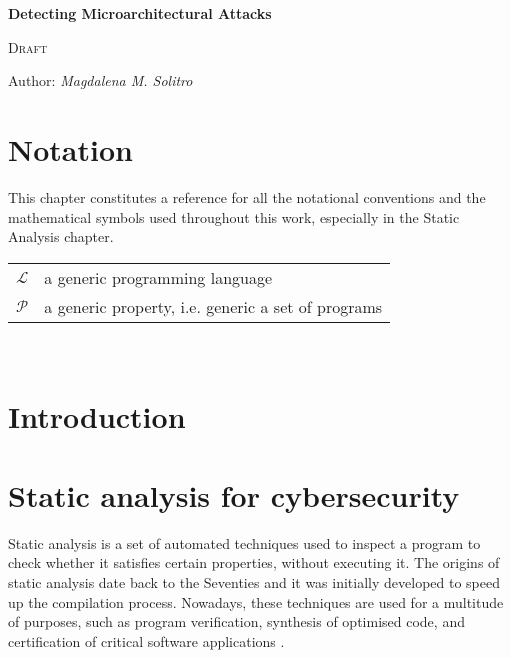 \documentclass[12pt,a4paper]{book}
\theoremstyle{definition}
\begin{document}
	
	\begin{titlepage}
		\begin{center}
			\vspace*{1cm}
			
			\Huge
			\textbf{\Huge Detecting Microarchitectural Attacks}
			
			\vspace{0.3cm}
			\LARGE \textsc{Draft}
			
			\vspace{1.5cm}
			
			\large Author: \textit{Magdalena M. Solitro}
			
			\vfill
		\end{center}
	\end{titlepage}
	
	\tableofcontents
	
	\mainmatter
	
	\chapter*{Notation}
	This chapter constitutes a reference for all the notational conventions and the mathematical symbols used throughout this work, especially in the Static Analysis chapter. 
	\renewcommand{\arraystretch}{2.0}
	\setlength{\tabcolsep}{25pt}
	\begin{tabular}{l l}
		$\mathcal{L}$ & a generic programming language \\
		$\mathcal{P}$ & a generic property, i.e. generic a set of programs
	\end{tabular}\\
	
	\chapter{Introduction}\label{chapter:intro}
	
	\chapter{Static analysis for cybersecurity}\label{chapter:static_analysis}
	Static analysis is a set of automated techniques used to inspect a program to check whether it satisfies certain properties, without executing it. The origins of static analysis date back to the Seventies and it was initially developed to speed up the compilation process. Nowadays, these techniques are used for a multitude of purposes, such as program verification, synthesis of optimised code, and certification of critical software applications \cite{Rival2020}. 
	
\end{document}
